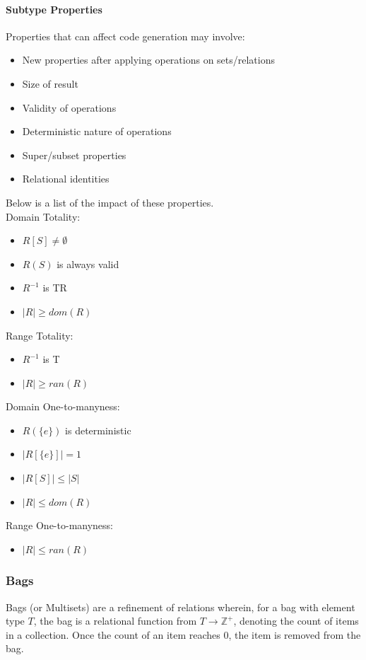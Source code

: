 \documentclass{article}
\begin{document}
\paragraph{Subtype Properties}
Properties that can affect code generation may involve:
\begin{itemize}
  \item New properties after applying operations on sets/relations
  \item Size of result
  \item Validity of operations
  \item Deterministic nature of operations
  \item Super/subset properties
  \item Relational identities
\end{itemize}
%
Below is a list of the impact of these properties.
\\
Domain Totality:
\begin{itemize}
  \item $R[S] \neq \emptyset$
  \item $R(S)$ is always valid
  \item $R^{-1}$ is TR
  \item $|R| \geq dom(R)$
\end{itemize}
%
Range Totality:
\begin{itemize}
  \item $R^{-1}$ is T
  \item $|R| \geq ran(R)$
\end{itemize}
%
Domain One-to-manyness:
\begin{itemize}
  \item $R(\{e\})$ is deterministic
  \item $|R[\{e\}]| = 1$
  \item $|R[S]| \leq |S|$
  \item $|R| \leq dom(R)$
\end{itemize}
%
Range One-to-manyness:
\begin{itemize}
  \item $|R| \leq ran(R)$
\end{itemize}

\subsubsection{Bags}
Bags (or Multisets) are a refinement of relations wherein, for a bag with element type $T$, the bag is a relational function from $T \rightarrow \mathbb{Z}^+$, denoting the count of items in a collection. Once the count of an item reaches 0, the item is removed from the bag.
\end{document}
